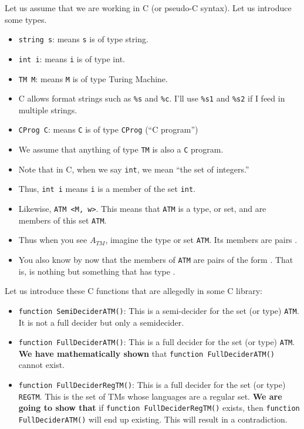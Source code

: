 \documentclass[10pt]{article}
\begin{document}
Let us assume that we are working in C (or pseudo-C syntax).
Let us introduce some types.
\begin{itemize}
\item {\tt string s}: means {\tt s} is of type string.
\item {\tt int i}: means {\tt i} is of type int.
\item {\tt TM M}: means {\tt M} is of type Turing Machine.
\item C allows format strings such as \verb|%s| and \verb|%c|. I'll use
   \verb|%s1| and \verb|%s2| if I feed in multiple strings.
\item {\tt CProg C}: means {\tt C} is of type {\tt CProg} (``C program'')
\item We assume that anything of type {\tt TM} is also a {\tt C} program.
\item Note that in C, when we say {\tt int}, we mean ``the set of integers.''
\item Thus, {\tt int i} means {\tt i} is a member of the set {\tt int}.
\item Likewise, {\tt ATM <M, w>}.  This means that {\tt ATM} is a type, or set,
  and {\tt <M,w>} are members of this set {\tt ATM}.
\item Thus when you see $A_{TM}$, imagine the type or set {\tt ATM}.
  Its members are pairs {\tt <M,w>}.
\item You also know by now that the members of {\tt ATM} are pairs
  of the form {\tt <CProg, string>}. That is,
 {\tt <M,w>} is nothing but something that has type {\tt <CProg, string>}. 
\end{itemize}

\vspace{.3cm}

Let us introduce these C functions that are allegedly in some C library:
\begin{itemize}
\item {\tt function SemiDeciderATM()}: This is a semi-decider for the set (or type) {\tt ATM}.
  It is not a full decider but only a semidecider.

\item {\tt function FullDeciderATM()}: This is a full decider for the set (or type) {\tt ATM}.
  {\bf We have mathematically shown} that {\tt function FullDeciderATM()} cannot exist.

\item {\tt function FullDeciderRegTM()}: This is a full decider for the set (or type) {\tt REGTM}.
  This is the set of TMs whose languages are a regular set.
  {\bf We are going to show that} if {\tt function FullDeciderRegTM()} exists, then
  {\tt function FullDeciderATM()} will end up existing. This will result in a contradiction.
\end{itemize}
\end{document}
